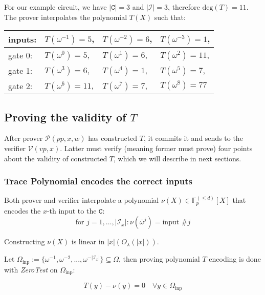 \documentclass[../lecture-notes.tex]{subfiles}
\begin{document}
\begin{example}
For our example circuit, we have \(|\texttt{C}| = 3\) and \(|\mathcal{I}| = 3\), therefore \(\text{deg}(T) = 11\). The prover interpolates the polynomial \(T(X)\) such that:
\begin{center}
\begin{tabular}{l l l l}
  inputs: & $T(\omega^{-1}) = 5$, & $T(\omega^{-2}) = 6$, & $T(\omega^{-3}) = 1$, \\ \hline
  gate 0: & $T(\omega^{0}) = 5$, & $T(\omega^{1}) = 6$, & $T(\omega^{2}) = 11$, \\
  gate 1: & $T(\omega^{3}) = 6$, & $T(\omega^{4}) = 1$, & $T(\omega^{5}) = 7$, \\
  gate 2: & $T(\omega^{6}) = 11$, & $T(\omega^{7}) = 7$, & $T(\omega^{8}) = 77$ \\ 
\end{tabular}
\end{center}
\end{example}

\subsection{Proving the validity of \texorpdfstring{\(T\)}{T}}

After prover \(\mathcal{P}(pp, x, w)\) has constructed \(T\), it commits it and sends to the verifier \(\mathcal{V}(vp, x)\). Latter must verify (meaning former must prove) four points about the validity of constructed \(T\), which we will describe in next sections.

\subsubsection{Trace Polynomial encodes the correct inputs}
Both prover and verifier interpolate a polynomial \(\nu(X) \in \mathbb{F}_p^{(\leq d)}[X] \) that encodes the \(x\)-th input to the \(\texttt{C}\):
\[\text{for } j = 1, \dots, |\mathcal{I}_x| : \nu(\bar{\omega}^j) = \text{input } \#j\]

\begin{remark}
Constructing \(\nu(X)\) is linear in \(|x| \left( O_\lambda(|x|) \right)\).
\end{remark}

Let \(\Omega_{\text{inp}} := \{ \omega^{-1}, \omega^{-2}, ..., \omega^{-|\mathcal{I}_x|} \} \subseteq \Omega\), then proving polynomial \(T\) encoding is done with \textit{ZeroTest} on \(\Omega_{\text{inp}}\):

\[T(y) - \nu(y) = 0 \quad \forall y \in \Omega_{\text{inp}}\]
\end{document}
